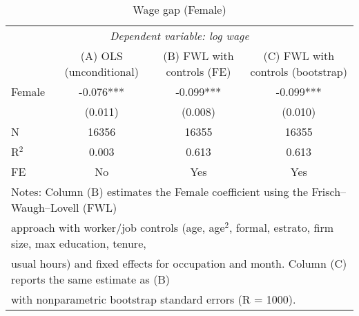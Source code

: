 \begin{table}[!htbp]\centering
\caption{Wage gap (Female)}\label{tab:wagegap}
\begin{tabular}{lccc}
\toprule
\multicolumn{4}{c}{\textit{Dependent variable: log wage}}\\[4pt]
 & (A) OLS (unconditional) & (B) FWL with controls (FE) & (C) FWL with controls (bootstrap) \\
\midrule
Female & -0.076*** & -0.099*** & -0.099*** \\
 & (0.011) & (0.008) & (0.010) \\
\midrule
N & 16356 & 16355 & 16355 \\
R$^2$ & 0.003 & 0.613 & 0.613 \\
FE & No & Yes & Yes \\
\bottomrule
\multicolumn{4}{l}{\footnotesize Notes: Column (B) estimates the Female coefficient using the Frisch--Waugh--Lovell (FWL)} \\
\multicolumn{4}{l}{\footnotesize approach with worker/job controls (age, age$^2$, formal, estrato, firm size, max education, tenure,} \\
\multicolumn{4}{l}{\footnotesize usual hours) and fixed effects for occupation and month. Column (C) reports the same estimate as (B)} \\
\multicolumn{4}{l}{\footnotesize with nonparametric bootstrap standard errors (R = 1000).} \\
\end{tabular}
\end{table}
